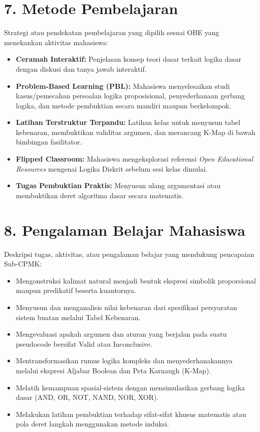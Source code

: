 \documentclass[12pt,a4paper]{article}
\begin{document}
\section*{7. Metode Pembelajaran}

Strategi atau pendekatan pembelajaran yang dipilih sesuai OBE yang menekankan aktivitas mahasiswa:

\begin{itemize}[leftmargin=*]
  \item \textbf{Ceramah Interaktif:} Penjelasan konsep teori dasar terkait logika dasar dengan diskusi dan tanya jawab interaktif.
  \item \textbf{Problem-Based Learning (PBL):} Mahasiswa menyelesaikan studi kasus/pemecahan persoalan logika proposisional, penyederhanaan gerbang logika, dan metode pembuktian secara mandiri maupun berkelompok.
  \item \textbf{Latihan Terstruktur Terpandu:} Latihan kelas untuk menyusun tabel kebenaran, membuktikan validitas argumen, dan merancang K-Map di bawah bimbingan fasilitator.
  \item \textbf{Flipped Classroom:} Mahasiswa mengeksplorasi referensi \textit{Open Educational Resources} mengenai Logika Diskrit sebelum sesi kelas dimulai.
  \item \textbf{Tugas Pembuktian Praktis:} Menyusun ulang argumentasi atau membuktikan deret algoritma dasar secara matematis.
\end{itemize}

\vspace{0.5cm}

\section*{8. Pengalaman Belajar Mahasiswa}

Deskripsi tugas, aktivitas, atau pengalaman belajar yang mendukung pencapaian Sub-CPMK:

\begin{itemize}[leftmargin=*]
  \item Mengonstruksi kalimat natural menjadi bentuk ekspresi simbolik proporsional maupun predikatif beserta kuantornya.
  \item Menyusun dan menganalisis nilai kebenaran dari spesifikasi persyaratan sistem buatan melalui Tabel Kebenaran.
  \item Mengevaluasi apakah argumen dan aturan yang berjalan pada suatu pseudocode bersifat Valid atau Inconclusive.
  \item Mentransformasikan rumus logika kompleks dan menyederhanakannya melalui ekspresi Aljabar Boolean dan Peta Karnaugh (K-Map).
  \item Melatih kemampuan spasial-sistem dengan mensimulasikan gerbang logika dasar (AND, OR, NOT, NAND, NOR, XOR).
  \item Melakukan latihan pembuktian terhadap sifat-sifat khusus matematis atau pola deret langkah menggunakan metode induksi.
\end{itemize}
\end{document}
